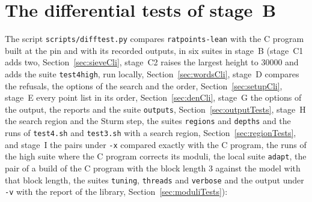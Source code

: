\section{The differential tests of stage~B}

The script \verb|scripts/difftest.py| compares \verb|ratpoints-lean| with the C program built at the
pin and with its recorded outputs, in six suites in stage~B (stage~C1 adds two,
Section~\ref{sec:sieveCli}, stage~C2 raises the largest height to $30000$ and adds the suite
\verb|test4high|, run locally, Section~\ref{sec:wordsCli}, stage~D compares the refusals, the
options of the search and the order, Section~\ref{sec:setupCli}, stage~E every point list in its
order, Section~\ref{sec:denCli}, stage~G the options of the output, the reports and the suite
\verb|outputs|, Section~\ref{sec:outputTests}, stage~H the search region and the Sturm step,
the suites \verb|regions| and \verb|depths| and the runs of \verb|test4.sh| and \verb|test3.sh|
with a search region, Section~\ref{sec:regionTests}, and stage~I the pairs under \verb|-x| compared
exactly with the C program, the runs of the high suite where the C program corrects its moduli, the
local suite \verb|adapt|, the pair of a build of the C program with the block length $3$ against
the model with that block length, the suites \verb|tuning|, \verb|threads| and \verb|verbose| and
the output under \verb|-v| with the report of the library, Section~\ref{sec:moduliTests}):
